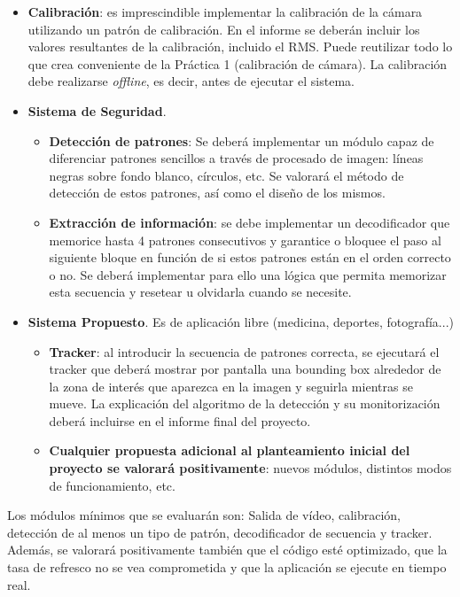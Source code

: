 \begin{itemize}
    \item \textbf{Calibración}: es imprescindible implementar la calibración de la cámara utilizando un patrón de calibración. En el informe se deberán incluir los valores resultantes de la calibración, incluido el RMS. Puede reutilizar todo lo que crea conveniente de la Práctica 1 (calibración de cámara). La calibración debe realizarse \textit{offline}, es decir, antes de ejecutar el sistema.
    
    \item \textbf{Sistema de Seguridad}.
    \begin{itemize}
        \item \textbf{Detección de patrones}: Se deberá implementar un módulo capaz de diferenciar patrones sencillos a través de procesado de imagen: líneas negras sobre fondo blanco, círculos, etc. Se valorará el método de detección de estos patrones, así como el diseño de los mismos.
        
        \item \textbf{Extracción de información}: se debe implementar un decodificador que memorice hasta 4 patrones consecutivos y garantice o bloquee el paso al siguiente bloque en función de si estos patrones están en el orden correcto o no. Se deberá implementar para ello una lógica que permita memorizar esta secuencia y resetear u olvidarla cuando se necesite.
    \end{itemize}
    \item \textbf{Sistema Propuesto}. Es de aplicación libre (medicina, deportes, fotografía...)
    \begin{itemize}
        \item \textbf{Tracker}: al introducir la secuencia de patrones correcta, se ejecutará el tracker que deberá mostrar por pantalla una bounding box alrededor de la zona de interés que aparezca en la imagen y seguirla mientras se mueve. La explicación del algoritmo de la detección y su monitorización deberá incluirse en el informe final del proyecto.
        \item \textbf{Cualquier propuesta adicional al planteamiento inicial del proyecto se valorará positivamente}: nuevos módulos, distintos modos de funcionamiento, etc.
    \end{itemize}
\end{itemize}

Los módulos mínimos que se evaluarán son: Salida de vídeo, calibración, detección de al menos un tipo de patrón, decodificador de secuencia y tracker. Además, se valorará positivamente también que el código esté optimizado, que la tasa de refresco no se vea comprometida y que la aplicación se ejecute en tiempo real.